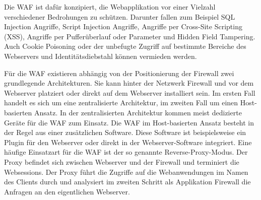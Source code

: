 \documentclass[12pt,oneside,a4paper,parskip]{scrbook}
\begin{document}
    Die WAF ist dafür konzipiert, die Webapplikation vor einer Vielzahl verschiedener Bedrohungen zu schützen. Darunter fallen zum Beispiel SQL Injection Angriffe, Script Injection Angriffe, Angriffe per Cross-Site Scripting (XSS), Angriffe per Pufferüberlauf oder Parameter und Hidden Field Tampering. Auch Cookie Poisoning oder der unbefugte Zugriff auf bestimmte Bereiche des Webservers und Identitätsdiebstahl können vermieden werden.

    Für die WAF existieren abhängig von der Positionierung der Firewall zwei grundlegende Architekturen. Sie kann hinter der Netzwerk Firewall und vor dem Webserver platziert oder direkt auf dem Webserver installiert sein. Im ersten Fall handelt es sich um eine zentralisierte Architektur, im zweiten Fall um einen Host-basierten Ansatz. In der zentralisierten Architektur kommen meist dedizierte Geräte für die WAF zum Einsatz. Die WAF im Host-basierten Ansatz besteht in der Regel aus einer zusätzlichen Software. Diese Software ist beispielsweise ein Plugin für den Webserver oder direkt in der Webserver-Software integriert. Eine häufige Einsatzart für die WAF ist der so genannte Reverse-Proxy-Modus. Der Proxy befindet sich zwischen Webserver und der Firewall und terminiert die Websessions. Der Proxy führt die Zugriffe auf die Webanwendungen im Namen des Clients durch und analysiert im zweiten Schritt als Applikation Firewall die Anfragen an den eigentlichen Webserver. \cite{WAF}
    \newpage
\end{document}
